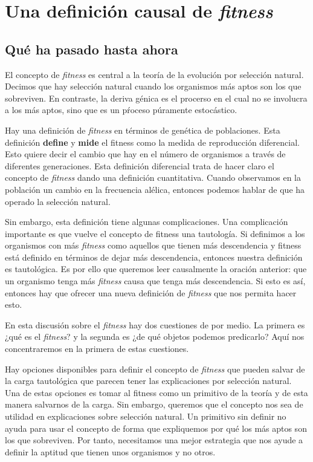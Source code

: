 
\chapter{Una definición causal de \emph{fitness}}

\section{Qué ha pasado hasta ahora}

\noindent El concepto de \emph{fitness} es central a la teoría de la evolución por selección natural. Decimos que hay selección natural cuando los organismos más aptos son los que sobreviven. En contraste, la deriva génica es el procerso en el cual no se involucra a los más aptos, sino que es un pŕoceso púramente estocástico.

Hay una definición de \emph{fitness} en términos de genética de poblaciones. Esta definición \textbf{define} y \textbf{mide} el fitness como la medida de reproducción diferencial. Esto quiere decir el cambio que hay en el número de organismos a través de diferentes generaciones. Esta definición diferencial trata de hacer claro el concepto de \emph{fitness} dando una definición cuantitativa. Cuando observamos en la población un cambio en la frecuencia alélica, entonces podemos hablar de que ha operado la selección natural.

Sin embargo, esta definición tiene algunas complicaciones. Una complicación importante es que vuelve el concepto de fitness una tautología. Si definimos a los organismos con más \emph{fitness} como aquellos que tienen más descendencia y fitness está definido en términos de dejar más descendencia, entonces nuestra definición es tautológica. Es por ello que queremos leer causalmente la oración anterior: que un organismo tenga más \emph{fitness} causa que tenga más descendencia. Si esto es así, entonces hay que ofrecer una nueva definición de \emph{fitness} que nos permita hacer esto.

En esta discusión sobre el \emph{fitness} hay dos cuestiones de por medio. La primera es ¿qué es el \emph{fitness}? y la segunda es ¿de qué objetos podemos predicarlo? Aquí nos concentraremos en la primera de estas cuestiones.

Hay opciones disponibles para definir el concepto de \emph{fitness} que pueden salvar de la carga tautológica que parecen tener las explicaciones por selección natural. Una de estas opciones es tomar al fitness como un primitivo de la teoría y de esta manera salvarnos de la carga. Sin embargo, queremos que el concepto nos sea de utilidad en explicaciones sobre selección natural. Un primitivo sin definir no ayuda para usar el concepto de forma que expliquemos por qué los más aptos son los que sobreviven. Por tanto, necesitamos una mejor estrategia que nos ayude a definir la aptitud que tienen unos organismos y no otros.

